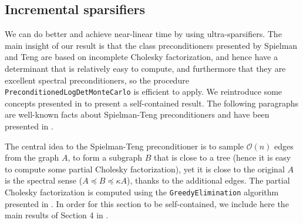 


\subsection{Incremental sparsifiers\label{sec:Incremental-sparsifiers}}

We can do better and achieve near-linear time by using ultra-sparsifiers.
The main insight of our result is that the class preconditioners presented
by Spielman and Teng are based on incomplete Cholesky factorization,
and hence have a determinant that is relatively easy to compute, and
furthermore that they are excellent spectral preconditioners, so the
procedure \texttt{PreconditionedLogDetMonteCarlo} is efficient to
apply. We reintroduce some concepts presented in \cite{Koutis2010}
to present a self-contained result. The following paragraphs are well-known
facts about Spielman-Teng preconditioners and have been presented
in \cite{Koutis2010,Spielman2009a}.

The central idea to the Spielman-Teng preconditioner is to sample
$\mathcal{O}\left(n\right)$ edges from the graph $A$, to form a
subgraph $B$ that is close to a tree (hence it is easy to compute
some partial Cholesky factorization), yet it is close to the original
$A$ is the spectral sense ($A\preceq B\preceq\kappa A$), thanks
to the additional edges. The partial Cholesky factorization is computed
using the \texttt{GreedyElimination} algorithm presented in \cite{Koutis2010}.
In order for this section to be self-contained, we include here the
main results of Section 4 in \cite{Spielman2009a}.

